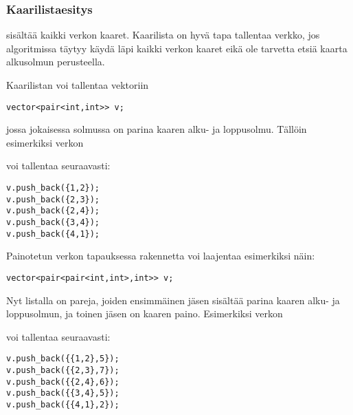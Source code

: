 \subsubsection{Kaarilistaesitys}


 sisältää kaikki verkon kaaret.
Kaarilista on hyvä tapa tallentaa verkko,
jos algoritmissa täytyy käydä läpi
kaikki verkon kaaret eikä ole tarvetta
etsiä kaarta alkusolmun perusteella.

Kaarilistan voi tallentaa vektoriin
\begin{lstlisting}
vector<pair<int,int>> v;
\end{lstlisting}
jossa jokaisessa solmussa on parina kaaren
alku- ja loppusolmu.
Tällöin esimerkiksi verkon

\begin{center}
\end{center}
voi tallentaa seuraavasti:
\begin{lstlisting}
v.push_back({1,2});
v.push_back({2,3});
v.push_back({2,4});
v.push_back({3,4});
v.push_back({4,1});
\end{lstlisting}

\noindent
Painotetun verkon tapauksessa rakennetta voi laajentaa
esimerkiksi näin:
\begin{lstlisting}
vector<pair<pair<int,int>,int>> v;
\end{lstlisting}
Nyt listalla on pareja, joiden ensimmäinen jäsen
sisältää parina kaaren alku- ja loppusolmun,
ja toinen jäsen on kaaren paino.
Esimerkiksi verkon

\begin{center}
\end{center}

voi tallentaa seuraavasti:

\begin{lstlisting}
v.push_back({{1,2},5});
v.push_back({{2,3},7});
v.push_back({{2,4},6});
v.push_back({{3,4},5});
v.push_back({{4,1},2});
\end{lstlisting}





